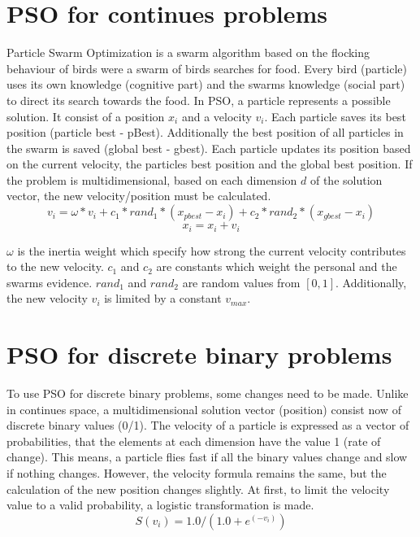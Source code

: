 \documentclass{article}
\begin{document}
\section{PSO for continues problems}
\label{lbl-pso-cont}
Particle Swarm Optimization is a swarm algorithm based on the flocking behaviour of birds were a swarm of birds searches for food. Every bird (particle) uses its own knowledge (cognitive part) and the swarms knowledge (social part) to direct its search towards the food. In PSO, a particle represents a possible solution. It consist of a position $x_i$ and a velocity $v_i$. Each particle saves its best position (particle best - pBest). Additionally the best position of all particles in the swarm is saved (global best - gbest). Each particle updates its position based on the current velocity, the particles best position and the global best position. If the problem is multidimensional, based on each dimension $d$ of the solution vector, the new velocity/position must be calculated.
\begin{equation}
\label{formula-1}
v_i = \omega * v_i + c_1 * rand_1 * (x_{pbest} - x_i) + c_2 * rand_2 * (x_{gbest} - x_i)
\end{equation}
\begin{equation}
\label{formula-2}
x_i = x_i + v_i
\end{equation}

$\omega$ is the inertia weight which specify how strong the current velocity contributes to the new velocity. $c_1$ and $c_2$ are constants which weight the personal and the swarms evidence. $rand_1$ and $rand_2$ are random values from $[0,1]$. Additionally, the new velocity $v_i$ is limited by a constant $v_{max}$.

\section{PSO for discrete binary problems}
\label{lbl-pso-disc}
To use PSO for discrete binary problems, some changes need to be made. Unlike in continues space, a multidimensional solution vector (position) consist now of discrete binary values (0/1). The velocity of a particle is expressed as a vector of probabilities, that the elements at each dimension have the value 1 (rate of change). This means, a particle flies fast if all the binary values change and slow if nothing changes. However, the velocity formula remains the same, but the calculation of the new position changes slightly. At first, to limit the velocity value to a valid probability, a logistic transformation is made.
\begin{equation}
\label{formula-3}
S(v_i) = 1.0 / (1.0 + e^{(-v_i)})
\end{equation}
\end{document}
